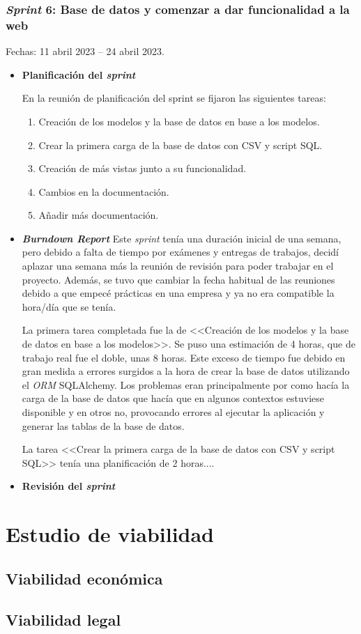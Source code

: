 \subsubsection{\textit{Sprint} 6: Base de datos y comenzar a dar funcionalidad a la web}
Fechas: 11 abril 2023 -- 24 abril 2023.
\begin{itemize}
\item\textbf{Planificación del \textit{sprint}}

En la reunión de planificación del sprint se fijaron las siguientes tareas:
\begin{enumerate}
		\item Creación de los modelos y la base de datos en base a los modelos.
		\item Crear la primera carga de la base de datos con CSV y script SQL.
		\item Creación de más vistas junto a su funcionalidad.
		\item Cambios en la documentación.
		\item Añadir más documentación.
\end{enumerate}

\item\textbf{\textit{Burndown Report}}
Este \textit{sprint} tenía una duración inicial de una semana, pero debido a falta de tiempo por exámenes y entregas de trabajos, decidí aplazar una semana más la reunión de revisión para poder trabajar en el proyecto. 
Además, se tuvo que cambiar la fecha habitual de las reuniones debido a que empecé prácticas en una empresa y ya no era compatible la hora/día que se tenía.

La primera tarea completada fue la de <<Creación de los modelos y la base de datos en base a los modelos>>. 
Se puso una estimación de 4 horas, que de trabajo real fue el doble, unas 8 horas. 
Este exceso de tiempo fue debido en gran medida a errores surgidos a la hora de crear la base de datos utilizando el \textit{ORM} SQLAlchemy. 
Los problemas eran principalmente por como hacía la carga de la base de datos que hacía que en algunos contextos estuviese disponible y en otros no, provocando errores al ejecutar la aplicación y generar las tablas de la base de datos.

La tarea <<Crear la primera carga de la base de datos con CSV y script SQL>> tenía una planificación de 2 horas....


\item\textbf{Revisión del \textit{sprint}}

\end{itemize}



\section{Estudio de viabilidad}

\subsection{Viabilidad económica}

\subsection{Viabilidad legal}


